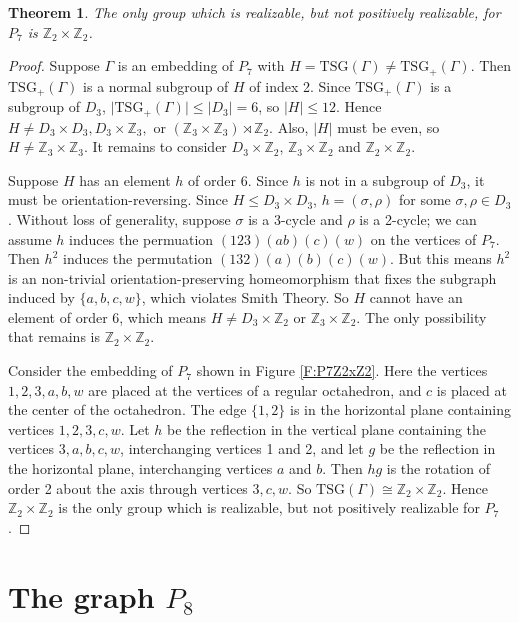 \documentclass[11]{amsart}
\def\Z{\mathbb{Z}}
\def\TSG{{\mathrm{TSG}}}
\newtheorem{theorem}{Theorem}[section]
\theoremstyle{definition}
\theoremstyle{remark}
\begin{document}
\begin{theorem}\label{T:P7or}
The only group which is realizable, but not positively realizable, for $P_7$ is $\Z_2 \times \Z_2$.
\end{theorem}
\begin{proof}
Suppose $\Gamma$ is an embedding of $P_7$ with $H = \TSG(\Gamma) \neq \TSG_+(\Gamma)$.  Then $\TSG_+(\Gamma)$ is a normal subgroup of $H$ of index 2.  Since $\TSG_+(\Gamma)$ is a subgroup of $D_3$, $\vert \TSG_+(\Gamma) \vert \leq \vert D_3 \vert = 6$, so $\vert H\vert \leq 12$.  Hence $H \neq D_3 \times D_3, D_3 \times \Z_3,$ or $(\Z_3 \times \Z_3) \rtimes \Z_2$. Also, $\vert H\vert$ must be even, so $H \neq \Z_3 \times \Z_3$. It remains to consider $D_3 \times \Z_2$, $\Z_3 \times \Z_2$ and $\Z_2 \times \Z_2$.

Suppose $H$ has an element $h$ of order 6. Since $h$ is not in a subgroup of $D_3$, it must be orientation-reversing. Since $H \leq D_3 \times D_3$, $h = (\sigma, \rho)$ for some $\sigma, \rho \in D_3$.  Without loss of generality, suppose $\sigma$ is a 3-cycle and $\rho$ is a 2-cycle; we can assume $h$ induces the permuation $(123)(ab)(c)(w)$ on the vertices of $P_7$.  Then $h^2$ induces the permutation $(132)(a)(b)(c)(w)$.  But this means $h^2$ is an non-trivial orientation-preserving homeomorphism that fixes the subgraph induced by $\{a, b, c, w\}$, which violates Smith Theory. So $H$ cannot have an element of order 6, which means $H \neq D_3 \times \Z_2$ or $\Z_3 \times \Z_2$. The only possibility that remains is $\Z_2 \times \Z_2$.

Consider the embedding of $P_7$ shown in Figure \ref{F:P7Z2xZ2}. Here the vertices $1, 2, 3, a, b, w$ are placed at the vertices of a regular octahedron, and $c$ is placed at the center of the octahedron. The edge $\{1,2\}$ is in the horizontal plane containing vertices $1, 2, 3, c, w$.  Let $h$ be the reflection in the vertical plane containing the vertices $3, a, b, c, w$, interchanging vertices 1 and 2, and let $g$ be the reflection in the horizontal plane, interchanging vertices $a$ and $b$. Then $hg$ is the rotation of order 2 about the axis through vertices $3, c, w$. So $\TSG(\Gamma) \cong \Z_2 \times \Z_2$.  Hence $\Z_2 \times \Z_2$ is the only group which is realizable, but not positively realizable for $P_7$.
\end{proof}

\section{The graph $P_8$}\label{S:P8}
\end{document}
